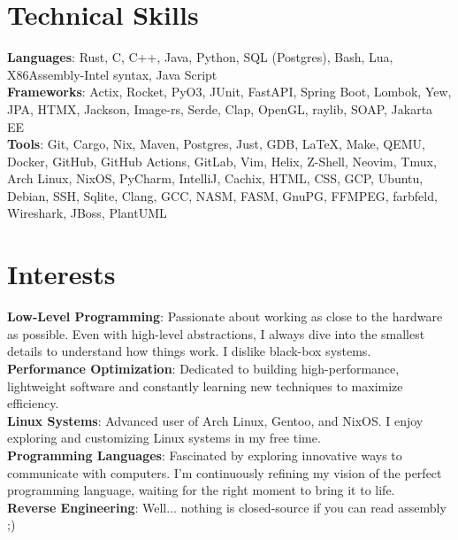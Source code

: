 \documentclass[letterpaper,11pt]{article}
\begin{document}
\section{Technical Skills}
 \begin{itemize}[leftmargin=0.15in, label={}]
    \small{\item{
     \textbf{Languages}{: Rust, C, C++, Java, Python, SQL (Postgres), Bash, Lua, X86Assembly-Intel syntax, Java Script} \\
     \textbf{Frameworks}{: Actix, Rocket, PyO3, JUnit, FastAPI, Spring Boot, Lombok, Yew, JPA, HTMX, Jackson, Image-rs, Serde, Clap, OpenGL, raylib, SOAP, Jakarta EE} \\
     \textbf{Tools}{: Git, Cargo, Nix, Maven, Postgres, Just, GDB, \LaTeX{}, Make, QEMU, Docker,
     GitHub, GitHub Actions, GitLab, Vim, Helix, Z-Shell, Neovim, Tmux, Arch Linux, NixOS,
     PyCharm, IntelliJ, Cachix, HTML, CSS, GCP, Ubuntu, Debian, SSH, Sqlite, Clang, GCC, NASM, FASM,
     GnuPG, FFMPEG, farbfeld, Wireshark, JBoss, PlantUML} \\
    }}
 \end{itemize}

\section{Interests}
 \begin{itemize}[leftmargin=0.15in, label={}]
    \small{\item{
     \textbf{Low-Level Programming}{: Passionate about working as close to the hardware as possible. Even with high-level abstractions, I always dive into the smallest details to understand how things work. I dislike black-box systems.} \\
     \textbf{Performance Optimization}{: Dedicated to building high-performance, lightweight software and constantly learning new techniques to maximize efficiency.} \\
     \textbf{Linux Systems}{: Advanced user of Arch Linux, Gentoo, and NixOS. I enjoy exploring and customizing Linux systems in my free time.} \\
     \textbf{Programming Languages}{: Fascinated by exploring innovative ways to communicate with computers. I’m continuously refining my vision of the perfect programming language, waiting for the right moment to bring it to life.} \\
     \textbf{Reverse Engineering}{: Well... nothing is closed-source if you can read assembly ;)}
    }}
 \end{itemize}
\end{document}
